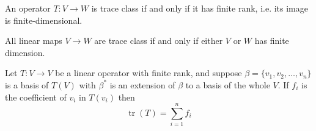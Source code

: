 \documentclass{treatise}
\begin{document}
\begin{shaded}
\begin{proposition}
\begin{enumerate}
\end{enumerate}
\end{proposition}
\begin{theorem}
An operator $T: V \to W$ is trace class if and only if it has finite rank, i.e. its image is finite-dimensional.
\end{theorem}
\begin{corollary}
All linear maps $V \to W$ are trace class if and only if either $V$ or $W$ has finite dimension.
\end{corollary}
\begin{corollary}
Let $T: V \to V$ be a linear operator with finite rank, and suppose $\beta = \{ v_1, v_2, \hdots, v_n \}$ is a basis of $T(V)$ with $\beta^*$ is an extension of $\beta$ to a basis of the whole $V$. If $f_i$ is the coefficient of $v_i$ in $T(v_i)$ then
$$\operatorname{tr}(T) = \sum_{i = 1}^n f_i$$
\end{corollary}


\end{shaded}
\end{document}
